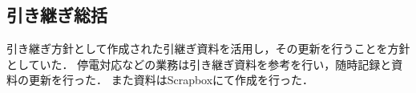 \subsection*{引き継ぎ総括}


引き継ぎ方針として作成された引継ぎ資料を活用し，その更新を行うことを方針としていた．
停電対応などの業務は引き継ぎ資料を参考を行い，随時記録と資料の更新を行った．
また資料はScrapboxにて作成を行った．

